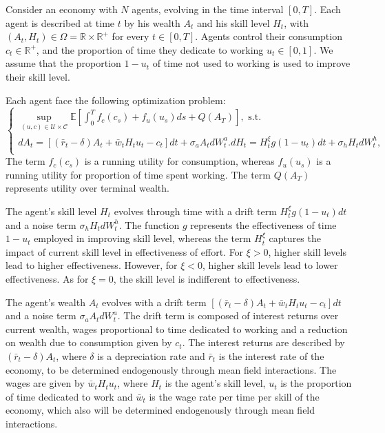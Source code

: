 Consider an economy with $N$ agents, evolving in the time interval $[0,T]$.
Each agent is described at time $t$ by his wealth $A_t$ and his skill level $H_t$,
with $(A_t, H_t) \in \Omega = \mathbb{R} \times \mathbb{R}^+$ for every $t \in [0,T]$.
Agents control their consumption $c_t \in \mathbb{R}^+$, and the proportion of time they dedicate to working $u_t \in [0,1]$. 
We assume that the proportion $1 - u_t$ of time not used to working is used to improve their skill level. 

Each agent face the following optimization problem:
\begin{equation}
\begin{cases}
        \sup\limits_{(u,c) \in \mathcal{U} \times \mathcal{C}}\mathbb{E} [ \int_0^T f_c(c_s) + f_u(u_s) ds + Q(A_T) ], \text{ s.t.}\\
        d A_t = \left[ (\bar r_t - \delta) A_t + \bar w_t H_t u_t - c_t  \right] dt + \sigma_a A_t d W^a_t.
        d H_t = H^\xi_t g(1 - u_t) dt + \sigma_h H_t d W^h_t,\\
\end{cases}
\end{equation}
The term $f_c(c_s)$ is a running utility for consumption, whereas $f_u(u_s)$ is a running utility for proportion of time spent working.
The term $Q(A_T)$ represents utility over terminal wealth.

The agent's skill level $H_t$ evolves through time with a drift term $H^\xi_t g(1 - u_t) dt$ and a noise term $\sigma_h H_t dW^h_t$.
The function $g$ represents the effectiveness of time $1 - u_t$ employed in improving skill level,
 whereas the term $H_t^\xi$ captures the impact of current skill level in effectiveness of effort.
 For $\xi > 0$, higher skill levels lead to higher effectiveness.
  However, for $\xi < 0$, higher skill levels lead to lower effectiveness.
  As for $\xi = 0$, the skill level is indifferent to effectiveness.

The agent's wealth $A_t$ evolves with a drift term $\left[ (\bar r_t - \delta) A_t + \bar w_t H_t u_t - c_t  \right] dt $ and a noise term $\sigma_a A_t d W^a_t$.
The drift term is composed of interest returns over current wealth, wages proportional to time dedicated to working and a reduction on wealth due to consumption given by $c_t$.
The interest returns are described by $(\bar r_t - \delta) A_t$, where $\delta$ is a depreciation rate and $\bar r_t$ is the interest rate of the economy, to be determined endogenously through mean field interactions.
The wages are given by $\bar w_t H_t u_t$, where $H_t$ is the agent's skill level, $u_t$ is the proportion of time dedicated to work and $\bar w_t$ is the wage rate per time per skill of the economy, which also will be determined endogenously through mean field interactions.

